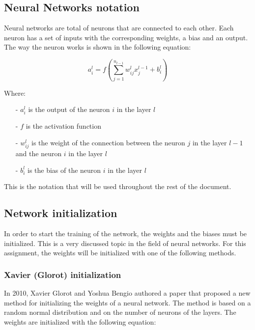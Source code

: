\subsection{Neural Networks notation}

Neural networks are total of neurons that are connected to each other. Each neuron has a set of inputs with the
corresponding weights, a bias and an output. The way the neuron works is shown in the following equation:

\begin{equation}
    \label{eq:neuron}
    a_i^l = f\left(\sum_{j=1}^{n_{l-1}} w_{ij}^l x_j^{l-1} + b_i^l\right)
\end{equation}


\noindent
Where:

\begin{itemize}
    \item[-] $a_i^l$ is the output of the neuron $i$ in the layer $l$
    \item[-] $f$ is the activation function
    \item[-] $w_{ij}^l$ is the weight of the connection between the neuron $j$ in the layer $l-1$ and the 
    neuron $i$ in the layer $l$
    \item[-] $b_i^l$ is the bias of the neuron $i$ in the layer $l$
\end{itemize}

\noindent
This is the notation that will be used throughout the rest of the document.

\subsection{Network initialization}

In order to start the training of the network, the weights and the biases must be initialized. This is a very 
discussed topic in the field of neural networks. For this assignment, the weights will be initialized with one 
of the following methods.

\subsubsection{Xavier (Glorot) initialization}

In 2010, Xavier Glorot and Yoshua Bengio authored a paper \cite{glorot} that proposed a new  method for 
initializing the weights of a neural network. The method is based on a random normal distribution and on the
number of neurons of the layers. The weights are initialized with the following equation:


